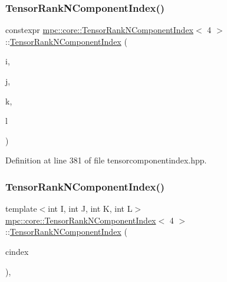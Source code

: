 \subsubsection{\texorpdfstring{Tensor\+Rank\+N\+Component\+Index()}{TensorRankNComponentIndex()}\hspace{0.1cm}{\footnotesize\ttfamily [1/2]}}
{\footnotesize\ttfamily constexpr \mbox{\hyperlink{classmpc_1_1core_1_1_tensor_rank_n_component_index}{mpc\+::core\+::\+Tensor\+Rank\+N\+Component\+Index}}$<$ 4 $>$\+::\mbox{\hyperlink{classmpc_1_1core_1_1_tensor_rank_n_component_index}{Tensor\+Rank\+N\+Component\+Index}} (\begin{DoxyParamCaption}\item[{int}]{i,  }\item[{int}]{j,  }\item[{int}]{k,  }\item[{int}]{l }\end{DoxyParamCaption})\hspace{0.3cm}{\ttfamily [inline]}}



Definition at line 381 of file tensorcomponentindex.\+hpp.

\mbox{\label{classmpc_1_1core_1_1_tensor_rank_n_component_index_3_014_01_4_adf1c84d14be60121eb9774a015e9cb5d}} 
\subsubsection{\texorpdfstring{Tensor\+Rank\+N\+Component\+Index()}{TensorRankNComponentIndex()}\hspace{0.1cm}{\footnotesize\ttfamily [2/2]}}
{\footnotesize\ttfamily template$<$int I, int J, int K, int L$>$ \\
\mbox{\hyperlink{classmpc_1_1core_1_1_tensor_rank_n_component_index}{mpc\+::core\+::\+Tensor\+Rank\+N\+Component\+Index}}$<$ 4 $>$\+::\mbox{\hyperlink{classmpc_1_1core_1_1_tensor_rank_n_component_index}{Tensor\+Rank\+N\+Component\+Index}} (\begin{DoxyParamCaption}\item[{const \mbox{\hyperlink{classmpc_1_1core_1_1_c_tensor_rank4_component_index}{C\+Tensor\+Rank4\+Component\+Index}}$<$ I, J, K, L $>$ \&}]{cindex }\end{DoxyParamCaption})\hspace{0.3cm}{\ttfamily [inline]}, {\ttfamily [explicit]}}




